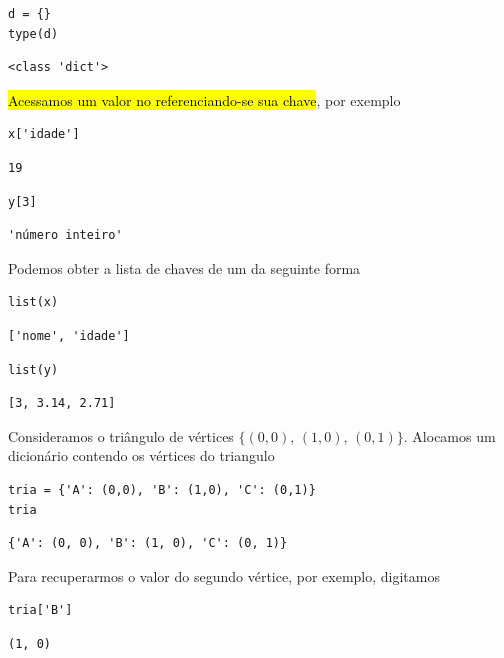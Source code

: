 \begin{lstlisting}
d = {}
type(d)
\end{lstlisting}

\begin{verbatim}
<class 'dict'>
\end{verbatim}
  

\hl{Acessamos um valor no {\PYTHONdict} referenciando-se sua chave}, por exemplo

\begin{lstlisting}
x['idade']
\end{lstlisting}

\begin{verbatim}
19
\end{verbatim}

\begin{lstlisting}
y[3]
\end{lstlisting}

\begin{verbatim}
'número inteiro'
\end{verbatim}


Podemos obter a lista de chaves de um {\PYTHONdict} da seguinte forma

\begin{lstlisting}
list(x)
\end{lstlisting}

\begin{verbatim}
['nome', 'idade']
\end{verbatim}

\begin{lstlisting}
list(y)
\end{lstlisting}

\begin{verbatim}
[3, 3.14, 2.71]
\end{verbatim}


\begin{ex}\label{cap_lingua_sec_colecao:ex:tria0}
Consideramos o triângulo de vértices $\{(0,0)$, $(1,0)$, $(0,1)\}$. Alocamos um dicionário contendo os vértices do triangulo

\begin{lstlisting}
tria = {'A': (0,0), 'B': (1,0), 'C': (0,1)}
tria
\end{lstlisting}

\begin{verbatim}
{'A': (0, 0), 'B': (1, 0), 'C': (0, 1)}
\end{verbatim}

Para recuperarmos o valor do segundo vértice, por exemplo, digitamos

\begin{lstlisting}
tria['B']
\end{lstlisting}

\begin{verbatim}
(1, 0)
\end{verbatim}

\end{ex}

